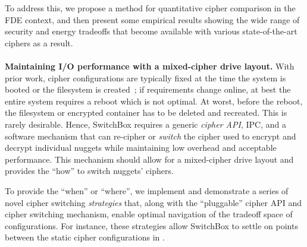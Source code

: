 To address this, we propose a method for quantitative cipher comparison in the
FDE context, and then present some empirical results showing the wide range of
security and energy tradeoffs that become available with various
state-of-the-art ciphers as a result.\\
\\
\textbf{Maintaining I/O performance with a mixed-cipher drive layout.} With
prior work, cipher configurations are typically fixed at the time the system is
booted or the filesystem is created~\cite{CiteAllTheFilesystems}; if
requirements change online, at best the entire system requires a reboot which is
not optimal. At worst, before the reboot, the filesystem or encrypted container
has to be deleted and recreated. This is rarely desirable. Hence, SwitchBox
requires a generic \emph{cipher API}, IPC, and a software mechanism that can
re-cipher or \emph{switch} the cipher used to encrypt and decrypt individual
nuggets while maintaining low overhead and acceptable performance. This
mechanism should allow for a mixed-cipher drive layout and provides the ``how''
to switch nuggets' ciphers.

To provide the ``when'' or ``where'', we implement and demonstrate a series of
novel cipher switching \textit{strategies} that, along with the ``pluggable''
cipher API and cipher switching mechanism, enable optimal navigation of the
tradeoff space of configurations. For instance, these strategies allow SwitchBox
to settle on points between the static cipher configurations in
.

